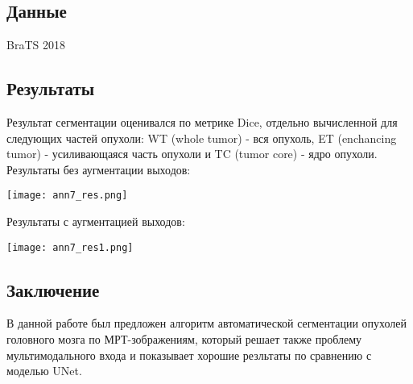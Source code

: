 \subsection*{Данные}
BraTS 2018
\subsection*{Результаты}
Результат сегментации  оценивался по метрике Dice, отдельно вычисленной
для следующих частей опухоли: WT (whole tumor) -  вся опухоль, ET (enchancing tumor) - 
усиливающаяся часть опухоли и TC (tumor core) - ядро опухоли. \\
Результаты без аугментации выходов: \\
\begin{minipage}{1.0\linewidth}
    \begin{center}
        \texttt{[image: ann7\_res.png]}
    \end{center}
\end{minipage}
Результаты с аугментацией выходов: \\
\begin{minipage}{1.0\linewidth}
    \begin{center}
        \texttt{[image: ann7\_res1.png]}
    \end{center}
\end{minipage}
\subsection*{Заключение}
В данной работе был предложен алгоритм автоматической сегментации 
опухолей головного мозга по МРТ-зображениям, который решает также проблему
мультимодального входа и показывает хорошие резльтаты по сравнению с моделью UNet.


